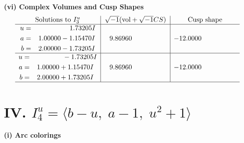 \documentclass[1p]{elsarticle_modified}
\theoremstyle{definition}
\newcommand{\I}{\sqrt{-1}}
\begin{document}
\newpage\flushleft \textbf{(vi) Complex Volumes and Cusp Shapes}
$$\begin{array}{c|c|c}  
\text{Solutions to }I^u_{3}& \I (\text{vol} + \sqrt{-1}CS) & \text{Cusp shape}\\
 \hline 
\begin{aligned}
u &= \phantom{-0.000000 -}1.73205 I \\
a &= \phantom{-}1.00000 - 1.15470 I \\
b &= \phantom{-}2.00000 - 1.73205 I\end{aligned}
 & \phantom{-}9.86960\phantom{ +0.000000I} & -12.0000\phantom{ +0.000000I} \\ \hline\begin{aligned}
u &= \phantom{-0.000000 } -1.73205 I \\
a &= \phantom{-}1.00000 + 1.15470 I \\
b &= \phantom{-}2.00000 + 1.73205 I\end{aligned}
 & \phantom{-}9.86960\phantom{ +0.000000I} & -12.0000\phantom{ +0.000000I}\\
 \hline 
 \end{array}$$\newpage\newpage\renewcommand{\arraystretch}{1}
\centering \section*{IV. $I^u_{4}= \langle b- u,\;a-1,\;u^2+1 \rangle$}
\flushleft \textbf{(i) Arc colorings}\\
\end{document}
